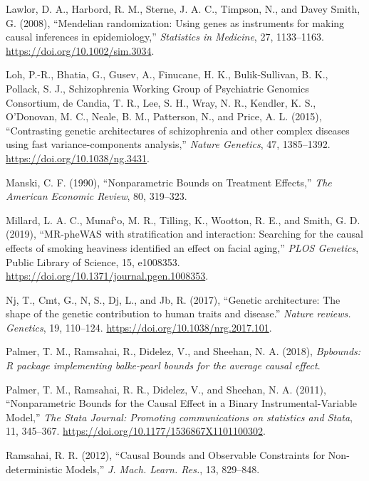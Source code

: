 \documentclass[
]{article}
\theoremstyle{plain}
\begin{document}
\leavevmode\hypertarget{ref-lawlor_mendelian_2008}{}%
Lawlor, D. A., Harbord, R. M., Sterne, J. A. C., Timpson, N., and Davey Smith, G. (2008), ``Mendelian randomization: Using genes as instruments for making causal inferences in epidemiology,'' \emph{Statistics in Medicine}, 27, 1133--1163. \url{https://doi.org/10.1002/sim.3034}.

\leavevmode\hypertarget{ref-loh_contrasting_2015}{}%
Loh, P.-R., Bhatia, G., Gusev, A., Finucane, H. K., Bulik-Sullivan, B. K., Pollack, S. J., Schizophrenia Working Group of Psychiatric Genomics Consortium, de Candia, T. R., Lee, S. H., Wray, N. R., Kendler, K. S., O'Donovan, M. C., Neale, B. M., Patterson, N., and Price, A. L. (2015), ``Contrasting genetic architectures of schizophrenia and other complex diseases using fast variance-components analysis,'' \emph{Nature Genetics}, 47, 1385--1392. \url{https://doi.org/10.1038/ng.3431}.

\leavevmode\hypertarget{ref-manski_nonparametric_1990}{}%
Manski, C. F. (1990), ``Nonparametric Bounds on Treatment Effects,'' \emph{The American Economic Review}, 80, 319--323.

\leavevmode\hypertarget{ref-millard_mr-phewas_2019}{}%
Millard, L. A. C., Munaf\a`o, M. R., Tilling, K., Wootton, R. E., and Smith, G. D. (2019), ``MR-pheWAS with stratification and interaction: Searching for the causal effects of smoking heaviness identified an effect on facial aging,'' \emph{PLOS Genetics}, Public Library of Science, 15, e1008353. \url{https://doi.org/10.1371/journal.pgen.1008353}.

\leavevmode\hypertarget{ref-nj_genetic_2017}{}%
Nj, T., Cmt, G., N, S., Dj, L., and Jb, R. (2017), ``Genetic architecture: The shape of the genetic contribution to human traits and disease.'' \emph{Nature reviews. Genetics}, 19, 110--124. \url{https://doi.org/10.1038/nrg.2017.101}.

\leavevmode\hypertarget{ref-bpbounds-package}{}%
Palmer, T. M., Ramsahai, R., Didelez, V., and Sheehan, N. A. (2018), \emph{Bpbounds: R package implementing balke-pearl bounds for the average causal effect}.

\leavevmode\hypertarget{ref-palmer_nonparametric_2011}{}%
Palmer, T. M., Ramsahai, R. R., Didelez, V., and Sheehan, N. A. (2011), ``Nonparametric Bounds for the Causal Effect in a Binary Instrumental-Variable Model,'' \emph{The Stata Journal: Promoting communications on statistics and Stata}, 11, 345--367. \url{https://doi.org/10.1177/1536867X1101100302}.

\leavevmode\hypertarget{ref-ramsahai_causal_2012}{}%
Ramsahai, R. R. (2012), ``Causal Bounds and Observable Constraints for Non-deterministic Models,'' \emph{J. Mach. Learn. Res.}, 13, 829--848.
\end{document}
